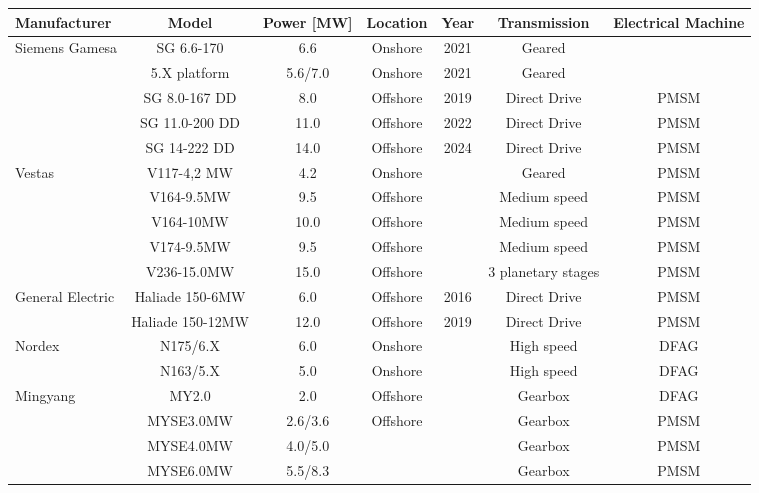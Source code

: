 \scriptsize
\begin{tabular}{lcccccc}\toprule
Manufacturer &Model &Power [MW] &Location &Year &Transmission &Electrical Machine \\\midrule
\multirow{5}{*}{Siemens Gamesa} &SG 6.6-170 &6.6 &Onshore &2021 &Geared & \\
&5.X platform &5.6/7.0 &Onshore &2021 &Geared & \\
&SG 8.0-167 DD &8.0 &Offshore &2019 &Direct Drive &PMSM \\
&SG 11.0-200 DD &11.0 &Offshore &2022 &Direct Drive &PMSM \\
&SG 14-222 DD &14.0 &Offshore &2024 &Direct Drive &PMSM \\ \midrule
\multirow{5}{*}{Vestas} &V117-4,2 MW &4.2 &Onshore & & Geared &PMSM \\
&V164-9.5MW &9.5 &Offshore & &Medium speed &PMSM \\
&V164-10MW &10.0 &Offshore & &Medium speed &PMSM \\
&V174-9.5MW &9.5 &Offshore & &Medium speed &PMSM \\
&V236-15.0MW &15.0 &Offshore & &3 planetary stages &PMSM \\ \midrule
\multirow{2}{*}{General Electric} &Haliade 150-6MW &6.0 &Offshore &2016 &Direct Drive &PMSM \\
&Haliade 150-12MW &12.0 &Offshore &2019 &Direct Drive &PMSM \\\midrule
\multirow{2}{*}{Nordex} &N175/6.X &6.0 &Onshore & &High speed &DFAG \\
&N163/5.X &5.0 &Onshore & &High speed &DFAG \\ \midrule
\multirow{4}{*}{Mingyang} &MY2.0 &2.0 &Offshore & &Gearbox &DFAG \\
&MYSE3.0MW &2.6/3.6 &Offshore & &Gearbox &PMSM \\
&MYSE4.0MW &4.0/5.0 & & &Gearbox &PMSM \\
&MYSE6.0MW &5.5/8.3 & & &Gearbox &PMSM \\
\bottomrule
\end{tabular}
